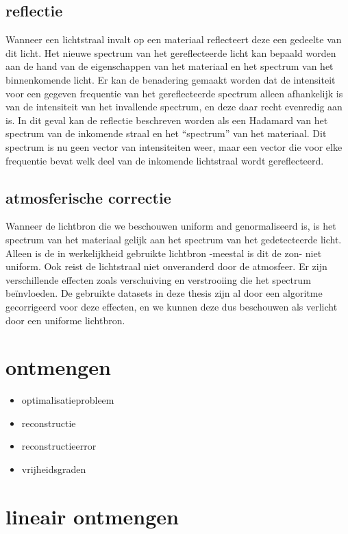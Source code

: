 \documentclass[12pt]{report}
\begin{document}
\subsection{reflectie}

Wanneer een lichtstraal invalt op een materiaal reflecteert deze een gedeelte van dit licht. Het nieuwe spectrum van het gereflecteerde licht kan bepaald worden aan de hand van de eigenschappen van het materiaal en het spectrum van het binnenkomende licht. Er kan de benadering gemaakt worden dat de intensiteit voor een gegeven frequentie van het gereflecteerde spectrum alleen afhankelijk is van de intensiteit van het invallende spectrum, en deze daar recht evenredig aan is. In dit geval kan de reflectie beschreven worden als een Hadamard van het spectrum van de inkomende straal en het ``spectrum'' van het materiaal. Dit spectrum is nu geen vector van intensiteiten weer, maar een vector die voor elke frequentie bevat welk deel van de inkomende lichtstraal wordt gereflecteerd. 

\subsection{atmosferische correctie}

Wanneer de lichtbron die we beschouwen uniform and genormaliseerd is, is het spectrum van het materiaal gelijk aan het spectrum van het gedetecteerde licht. Alleen is de in werkelijkheid gebruikte lichtbron -meestal is dit de zon- niet uniform. Ook reist de lichtstraal niet onveranderd door de atmosfeer. Er zijn verschillende effecten zoals verschuiving en  verstrooiing die het spectrum be\"invloeden. De gebruikte datasets in deze thesis zijn al door een algoritme gecorrigeerd voor deze effecten, en we kunnen deze dus beschouwen als verlicht door een uniforme lichtbron.

\section{ontmengen}


\begin{itemize}
\item optimalisatieprobleem
\item reconstructie
\item reconstructieerror
\item vrijheidsgraden
\end{itemize}

\section{lineair ontmengen}
\end{document}
